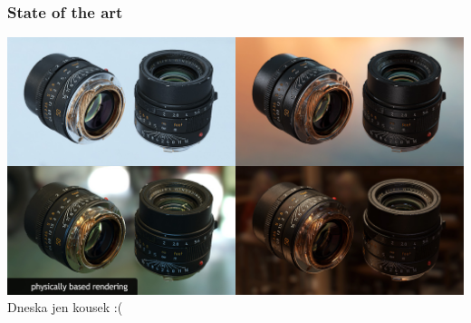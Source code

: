 \begin{frame}
    \frametitle{State of the art}
    \includegraphics[width=\textwidth]{pics/physicallyBasedRendering/pbr}
    \pause\vfill
    Dneska jen kousek :(
\end{frame}


